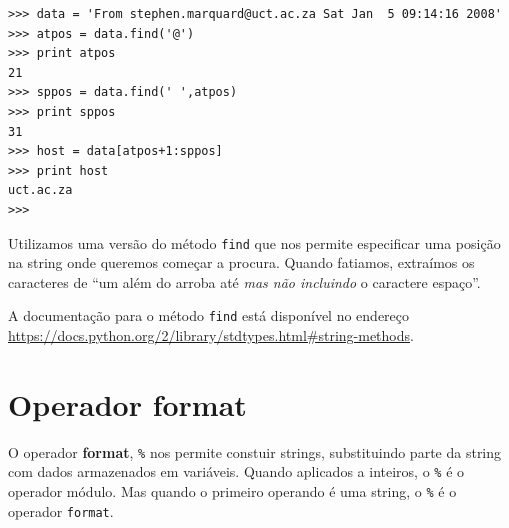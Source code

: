 {\beforeverb
\begin{verbatim}
>>> data = 'From stephen.marquard@uct.ac.za Sat Jan  5 09:14:16 2008'
>>> atpos = data.find('@')
>>> print atpos
21
>>> sppos = data.find(' ',atpos)
>>> print sppos
31
>>> host = data[atpos+1:sppos]
>>> print host
uct.ac.za
>>> 
\end{verbatim}
\afterverb
%
%
Utilizamos uma versão do método {\tt find} que nos permite especificar uma
posição na string onde queremos começar a procura. Quando fatiamos, extraímos
os caracteres de ``um além do arroba até \emph{mas não incluindo} o caractere
espaço''.


A documentação para o método {\tt find} está disponível no endereço
\url{https://docs.python.org/2/library/stdtypes.html#string-methods}.

\section{Operador format}



O operador {\bf format}, {\tt \%} nos permite constuir strings, substituindo
parte da string com dados armazenados em variáveis. Quando aplicados a
inteiros, o {\tt \%} é o operador módulo. Mas quando o primeiro operando é
uma string, o {\tt \%} é o operador {\tt format}.



}
